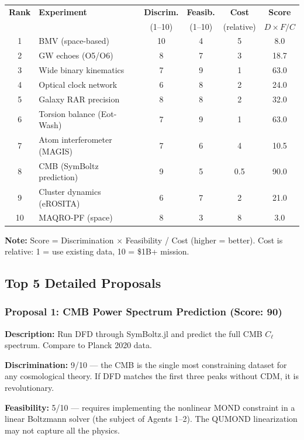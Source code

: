 \documentclass[11pt,a4paper]{article}
\begin{document}
\begin{center}
\begin{longtable}{clcccc}
\toprule
\textbf{Rank} & \textbf{Experiment} & \textbf{Discrim.} & \textbf{Feasib.} & \textbf{Cost} & \textbf{Score} \\
 & & (1--10) & (1--10) & (relative) & $D\times F/C$ \\
\midrule
\endhead
1 & BMV (space-based) & 10 & 4 & 5 & 8.0 \\
2 & GW echoes (O5/O6) & 8 & 7 & 3 & 18.7 \\
3 & Wide binary kinematics & 7 & 9 & 1 & 63.0 \\
4 & Optical clock network & 6 & 8 & 2 & 24.0 \\
5 & Galaxy RAR precision & 8 & 8 & 2 & 32.0 \\
6 & Torsion balance (Eot-Wash) & 7 & 9 & 1 & 63.0 \\
7 & Atom interferometer (MAGIS) & 7 & 6 & 4 & 10.5 \\
8 & CMB (SymBoltz prediction) & 9 & 5 & 0.5 & 90.0 \\
9 & Cluster dynamics (eROSITA) & 6 & 7 & 2 & 21.0 \\
10 & MAQRO-PF (space) & 8 & 3 & 8 & 3.0 \\
\bottomrule
\end{longtable}
\end{center}

\textbf{Note:} Score = Discrimination $\times$ Feasibility / Cost (higher = better). Cost is relative: 1 = use existing data, 10 = \$1B+ mission.

\subsection{Top 5 Detailed Proposals}

\subsubsection{Proposal 1: CMB Power Spectrum Prediction (Score: 90)}

\textbf{Description:} Run DFD through SymBoltz.jl and predict the full CMB $C_\ell$ spectrum. Compare to Planck 2020 data.

\textbf{Discrimination:} 9/10 --- the CMB is the single most constraining dataset for any cosmological theory. If DFD matches the first three peaks without CDM, it is revolutionary.

\textbf{Feasibility:} 5/10 --- requires implementing the nonlinear MOND constraint in a linear Boltzmann solver (the subject of Agents 1--2). The QUMOND linearization may not capture all the physics.
\end{document}
